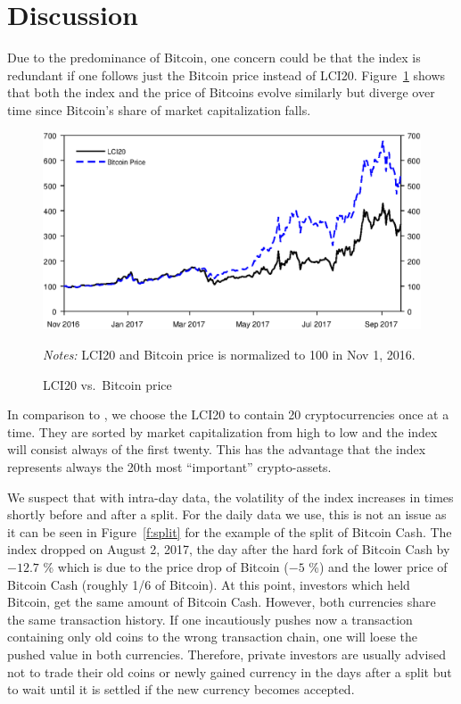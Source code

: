 \documentclass[11pt]{article}
\newcommand\fnotes[1]{\captionsetup{font=scriptsize}\caption*{\textsl{Notes:} #1}}
\begin{document}
\section{Discussion}

 Due to the predominance of Bitcoin, one concern could be that the index is redundant if one follows just the Bitcoin price instead of LCI20.
 Figure~\ref{f:lci20vsBTC} shows that both the index and the price of Bitcoins evolve similarly but diverge over time since Bitcoin's share of market capitalization falls.

 \begin{figure}[p]%
     \centering%
     \caption{LCI20 vs.\ Bitcoin price}\label{f:lci20vsBTC}%
     \includegraphics[width=\textwidth]{figs/lci20_vs_btc_norm.eps}%
     \medskip\newline%
     \fnotes{LCI20 and Bitcoin price is normalized to 100 in Nov 1, 2016.}
 \end{figure}

In comparison to \cite{Trimborn2016}, we choose the LCI20 to contain 20 cryptocurrencies once at a time.
They are sorted by market capitalization from high to low and the index will consist always of the first twenty.
This has the advantage that the index represents always the 20th most ``important'' crypto-assets.

We suspect that with intra-day data, the volatility of the index increases in times shortly before and after a split.
For the daily data we use, this is not an issue as it can be seen in Figure~\ref{f:split} for the example of the split of Bitcoin Cash.
The index dropped on August 2, 2017, the day after the hard fork of Bitcoin Cash by $-12.7$ \% which is due to the price drop of Bitcoin ($-5$ \%) and the lower price of Bitcoin Cash (roughly 1/6 of Bitcoin).
At this point, investors which held Bitcoin, get the same amount of Bitcoin Cash.
However, both currencies share the same transaction history.
If one incautiously pushes now a transaction containing only old coins to the wrong transaction chain, one will loese the pushed value in both currencies.
Therefore, private investors are usually advised not to trade their old coins or newly gained currency in the days after a split but to wait until it is settled if the new currency becomes accepted.
\end{document}
